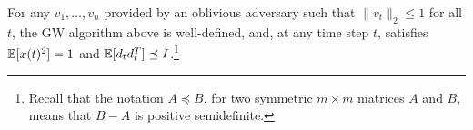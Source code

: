 \begin{theorem}\label{thm:gauss-prefix-komlos}
     For any $v_1, \ldots, v_n$ provided by an oblivious adversary such that $\|v_t\|_2 \le 1$ for all $t$, the GW algorithm above is well-defined, and, at any time step $t$, satisfies $\mathbb{E}[x(t)^2]=1$ and $\mathbb{E}[d_td_t^T]\preceq I$.\footnote{Recall that the notation $A\preceq B$, for two symmetric $m\times m$ matrices $A$ and $B$, means that $B-A$ is positive semidefinite.}
\end{theorem}
